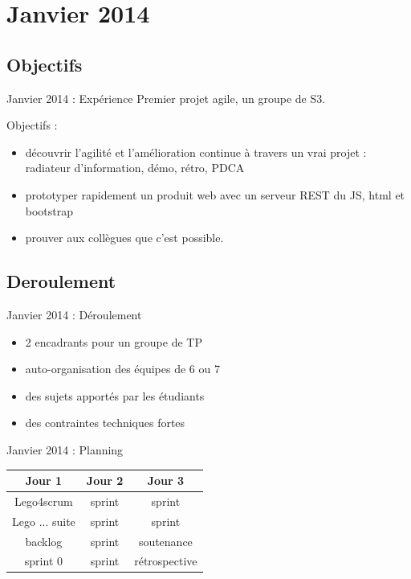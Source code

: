 \documentclass{beamer}
\begin{document}
\section{Janvier 2014}
\subsection{Objectifs}
\begin{frame}{Janvier 2014 : Expérience}
  Premier projet agile, un groupe de S3.

  Objectifs : 
  \begin{itemize}
    \item découvrir l'agilité et l'amélioration continue à travers un vrai projet : radiateur d'information, démo, rétro, PDCA
    \item prototyper rapidement un produit web avec un serveur REST du JS, html et bootstrap
    \item prouver aux collègues que c'est possible.
  \end{itemize}
\end{frame}

\subsection{Deroulement}
\begin{frame}{Janvier 2014 : Déroulement}
  \begin{itemize}
    \item 2 encadrants pour un groupe de TP
    \item auto-organisation des équipes de 6 ou 7
    \item des sujets apportés par les étudiants
    \item des contraintes techniques fortes
  \end{itemize}
\end{frame}

\begin{frame}{Janvier 2014 : Planning}
  \begin{center}
    \begin{tabular}{| c | c | c |}
      \hline
      \textbf{Jour 1} & \textbf{Jour 2} & \textbf{Jour 3} \\
      \hline \hline
      Lego4scrum & sprint & sprint \\
      \hline
      Lego ... suite & sprint & sprint \\
      \hline \hline
      backlog & sprint & soutenance \\
      \hline
      sprint 0 & sprint & rétrospective \\
      \hline
    \end{tabular}
  \end{center}
\end{frame}
\end{document}

